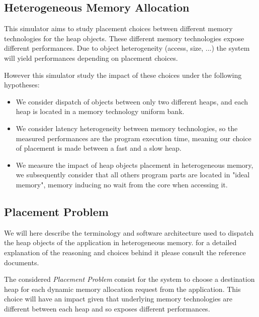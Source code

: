 \documentclass[10 pt]{article}
\begin{document}
\subsection{Heterogeneous Memory Allocation}

This simulator aims to study placement choices between different memory technologies for the heap objects. These different memory technologies expose different performances. Due to object heterogeneity (access, size, ...) the system will yield performances depending on placement choices.

\bigskip
However this simulator study the impact of these choices under the following hypotheses:

\begin{itemize}
  \item We consider dispatch of objects between only two different heaps, and each heap is located in a memory technology uniform bank.
  \item We consider latency heterogeneity between memory technologies, so the measured performances are the program execution time, meaning our choice of placement is made between a fast and a slow heap.
  \item We measure the impact of heap objects placement in heterogeneous memory, we subsequently consider that all others program parts are located in "ideal memory", memory inducing no wait from the core when accessing it.
\end{itemize}

\subsection{Placement Problem}
We will here describe the terminology and software architecture used to dispatch the heap objects of the application in heterogeneous memory. for a detailed explanation of the reasoning and choices behind it please consult the reference documents.

The considered \emph{Placement Problem} consist for the system to choose a destination heap for each dynamic memory allocation request from the application.
This choice will have an impact given that underlying memory technologies are different between each heap and so exposes different performances.
\end{document}
